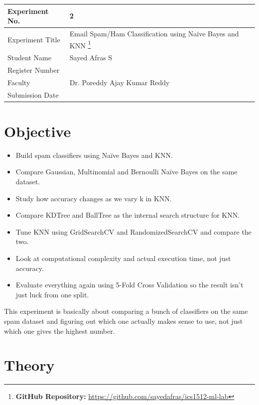 \documentclass[12pt,a4paper]{article}
\begin{document}
\begin{tabular}{|p{4cm}|p{11cm}|}
\hline
Experiment No. & 2 \\ \hline
Experiment Title & Email Spam/Ham Classification using Na\"ive Bayes and KNN
\footnote{\textbf{GitHub Repository: }\url{https://github.com/sayedafras/ics1512-ml-lab}}\\ \hline
Student Name & Sayed Afras S \\ \hline
Register Number & \\ \hline
Faculty & Dr. Poreddy Ajay Kumar Reddy \\ \hline
Submission Date & \\ \hline
\end{tabular}

\section{Objective}
\begin{itemize}
\item Build spam classifiers using Na\"ive Bayes and KNN.
\item Compare Gaussian, Multinomial and Bernoulli Na\"ive Bayes on the same dataset.
\item Study how accuracy changes as we vary k in KNN.
\item Compare KDTree and BallTree as the internal search structure for KNN.
\item Tune KNN using GridSearchCV and RandomizedSearchCV and compare the two.
\item Look at computational complexity and actual execution time, not just accuracy.
\item Evaluate everything again using 5-Fold Cross Validation so the result isn't just luck from one split.
\end{itemize}

This experiment is basically about comparing a bunch of classifiers on the same spam dataset and figuring out which one actually makes sense to use, not just which one gives the highest number.

\section{Theory}
\end{document}

